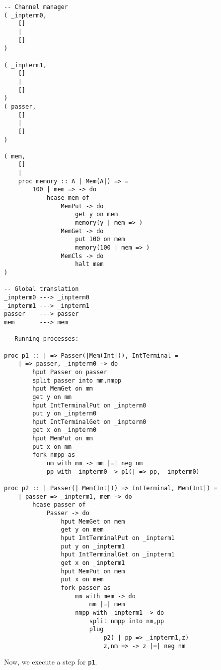 \documentclass{article}
\theoremstyle{plain}%
\theoremstyle{definition}
\theoremstyle{remark}
\begin{document}
\begin{verbatim}
-- Channel manager
( _inpterm0,  
    []
    |
    []
)

( _inpterm1,  
    []
    |
    []
)
( passer,
    []
    |
    []
)

( mem,
    []
    |
    proc memory :: A | Mem(A|) => =
        100 | mem => -> do
            hcase mem of
                MemPut -> do
                    get y on mem
                    memory(y | mem => )
                MemGet -> do
                    put 100 on mem
                    memory(100 | mem => )
                MemCls -> do
                    halt mem
)

-- Global translation
_inpterm0 ---> _inpterm0 
_inpterm1 ---> _inpterm1 
passer    ---> passer 
mem       ---> mem

-- Running processes:

proc p1 :: | => Passer(|Mem(Int|)), IntTerminal = 
    | => passer, _inpterm0 -> do
        hput Passer on passer
        split passer into mm,nmpp
        hput MemGet on mm 
        get y on mm
        hput IntTerminalPut on _inpterm0
        put y on _inpterm0
        hput IntTerminalGet on _inpterm0
        get x on _inpterm0
        hput MemPut on mm
        put x on mm
        fork nmpp as
            nm with mm -> mm |=| neg nm 
            pp with _inpterm0 -> p1(| => pp, _inpterm0)

proc p2 :: | Passer(| Mem(Int|)) => IntTerminal, Mem(Int|) =
    | passer => _inpterm1, mem -> do
        hcase passer of
            Passer -> do
                hput MemGet on mem
                get y on mem
                hput IntTerminalPut on _inpterm1
                put y on _inpterm1
                hput IntTerminalGet on _inpterm1
                get x on _inpterm1
                hput MemPut on mem
                put x on mem
                fork passer as
                    mm with mem -> do
                        mm |=| mem
                    nmpp with _inpterm1 -> do
                        split nmpp into nm,pp
                        plug
                            p2( | pp => _inpterm1,z)
                            z,nm => -> z |=| neg nm

\end{verbatim}
Now, we execute a step for \verb|p1|.
\end{document}
